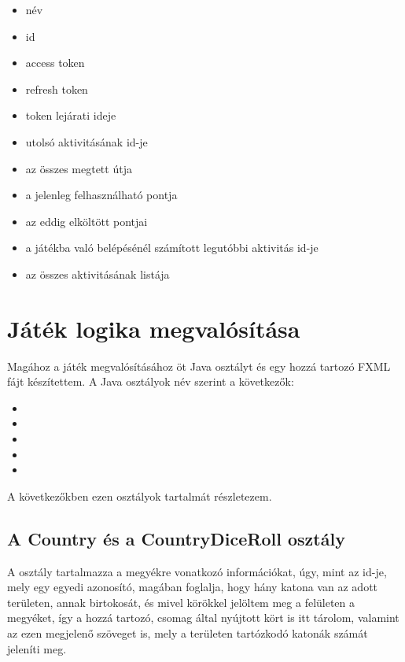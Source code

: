 \begin{itemize}
\setlength\itemsep{0em}
\item név 
\item id 
\item access token 
\item refresh token 
\item token lejárati ideje 
\item utolsó aktivitásának id-je 
\item az összes megtett útja 
\item a jelenleg felhasználható pontja 
\item az eddig elköltött pontjai 
\item a játékba való belépésénél számított legutóbbi aktivitás id-je 
\item az összes aktivitásának listája
\end{itemize}

\section{Játék logika megvalósítása}

Magához a játék megvalósításához öt Java osztályt és egy hozzá tartozó FXML fájt készítettem.
A Java osztályok név szerint a következők: 

\begin{itemize}
\setlength\itemsep{0em}
\item {}
\item {}
\item {}
\item {}
\item {}
\end{itemize}

A következőkben ezen osztályok tartalmát részletezem.

\subsection*{A Country és a CountryDiceRoll osztály}

A  osztály tartalmazza a megyékre vonatkozó információkat, úgy, mint az id-je, mely egy egyedi azonosító, magában foglalja, hogy hány katona van az adott területen, annak birtokosát, és mivel körökkel jelöltem meg a felületen a megyéket, így a hozzá tartozó,  csomag által nyújtott kört is itt tárolom, valamint az ezen megjelenő szöveget is, mely a területen tartózkodó katonák számát jeleníti meg. 

